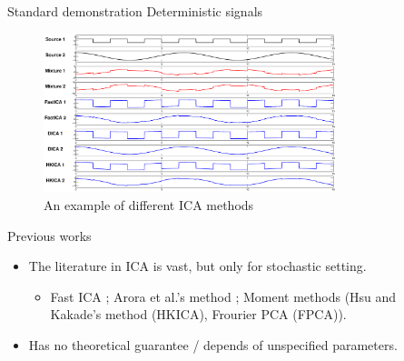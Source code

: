 \documentclass[final]{beamer} %
\begin{document}
\begin{frame}[c]
\begin{columns}[t,totalwidth=\textwidth]
\begin{column}{.24\textwidth}
\begin{block}{Standard demonstration}
Deterministic signals
			\begin{figure}
				\includegraphics[width = 0.8\textwidth]{demo}
				\caption*{An example of different ICA methods}
			\end{figure}
			\vspace{-0.5cm} 					
		\end{block}
		\vspace{0.5ex}
			
		\begin{block}{Previous works}
		\vspace{-0.5cm}
			\begin{itemize}
				\item The literature in ICA is vast, but only for stochastic setting.
				\begin{itemize}
					\item Fast ICA \citep{hyvarinen1999fast}; Arora et al.'s method \citep{arora2012provable}; Moment methods (Hsu and Kakade's method \citep{hsu2013learning} (HKICA), Frourier PCA \citep{goyal2014fourier} (FPCA)).	
				\end{itemize}
				\item Has no theoretical guarantee / depends of unspecified parameters.
			\end{itemize}
		\end{block}

	\end{column}
	\begin{column}{0.01\textwidth}
	\end{column}
	

\end{columns}
\end{frame}
\end{document}
